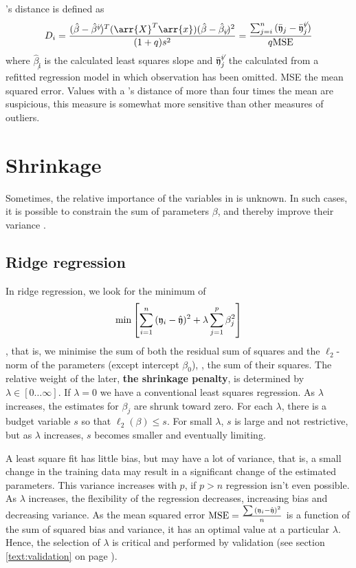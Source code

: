\begin{refsection}
's distance is defined as
\begin{equation}
  D_i = \frac{(\hat{\beta} - \hat{\beta}^{\not i})^T (\arr{X}^T\arr{x}) (\hat{\beta} - \hat{\beta}_{\not i})^2}{(1+q) s^2}
      = \frac{\sum_{j=i}^n{(\bar{\AbsVec{y}}_j - \bar{\AbsVec{y}}_j^{\not i})}}{q \mathrm{MSE}}
\end{equation}
where \( \hat{\beta}_{\not i} \) is the calculated least squares slope and \( \bar{\mathfrak{y}}_j^{\not i} \) the calculated   from a refitted regression model in which observation  has been omitted. \acs{MSE} the mean squared error. Values with a 's distance of more than four times the mean are suspicious, this measure is somewhat more sensitive than other measures of outliers.

\section{Shrinkage}

Sometimes, the relative importance of the variables in  is unknown. In such cases, it is possible to constrain the sum of parameters \(\beta \), and thereby improve their variance \parencite[chapter 6]{Jam-13}.

\subsection{Ridge regression}

In ridge regression, we look for the minimum of
\begin{equation}
  \min\left[\sum_{i=1}^n{(\mathfrak{y}_i - \hat{\mathfrak{y}})^2} + \lambda \sum_{j=1}^p{\beta_j^2} \right]
\end{equation}
, that is, we minimise the sum of both the residual sum of squares and the \(\ell_2 \)-norm of the parameters (except intercept \(\beta_0 \)), , the sum of their squares. The relative weight of the later, \textbf{the shrinkage penalty}, is determined by \(\lambda \in [0\ldots\infty] \). If \(\lambda = 0 \) we have a conventional least squares regression. As \(\lambda \) increases, the estimates for \(\beta_j \) are shrunk toward zero. For each \(\lambda \), there is a budget variable \(s \) so that \(\ell_2(\beta) \leq s \). For small \(\lambda \), \(s \) is large and not restrictive, but as \(\lambda \) increases, \(s \) becomes smaller and eventually limiting.

A least square fit has little bias, but may have a lot of variance, that is, a small change in the training data may result in a significant change of the estimated parameters. This variance increases with \(p \), if \(p > n \) regression isn't even possible. As \(\lambda \) increases, the flexibility of the regression decreases, increasing bias and decreasing variance. As the mean squared error \(\mathrm{MSE} = \frac{\sum{(\ensuremath{\mathfrak{y}}_i - \hat{\ensuremath{\mathfrak{y}}})^2}}{n} \) is a function of the sum of squared bias and variance, it has an optimal value at a particular \( \lambda \). Hence, the selection of \( \lambda \) is critical and performed by validation (see section \ref{text:validation} on page \pageref{text:validation}).


\end{refsection}
